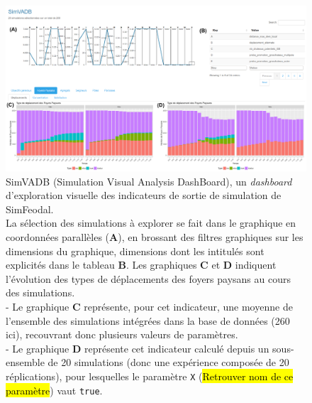 	\begin{figure}[H]
		\captionsetup{width=\linewidth}
		\includegraphics[width=\linewidth]{img/SimVADB_Dashboard2_annote.png}
		\caption{SimVADB (Simulation Visual Analysis DashBoard), un \textit{dashboard} d'exploration visuelle des indicateurs de sortie de simulation de SimFeodal.\\
		La sélection des simulations à explorer se fait dans le graphique en coordonnées parallèles (\textbf{A}), en \og brossant\fg{} des filtres graphiques sur les \og dimensions\fg{} du graphique, dimensions dont les intitulés sont explicités dans le tableau \textbf{B}.
		Les graphiques \textbf{C} et \textbf{D} indiquent l'évolution des types de déplacements des foyers paysans au cours des simulations.\\
		- Le graphique \textbf{C} représente, pour cet indicateur, une moyenne de l'ensemble des simulations intégrées dans la base de données (260 ici), recouvrant donc plusieurs valeurs de paramètres.\\
		- Le graphique \textbf{D} représente cet indicateur calculé depuis un sous-ensemble de 20 simulations (donc une expérience composée de 20 réplications), pour lesquelles le paramètre \og \texttt{X} \fg{}(\hl{Retrouver nom de ce paramètre}) vaut \texttt{true}.}
		\label{fig:simvadb_dashboard}
	\end{figure}

